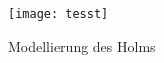 \begin{figure}
	\texttt{[image: tesst]}
	\caption{Modellierung des Holms}
	\label{fig:Holmmodellierung}
\end{figure}